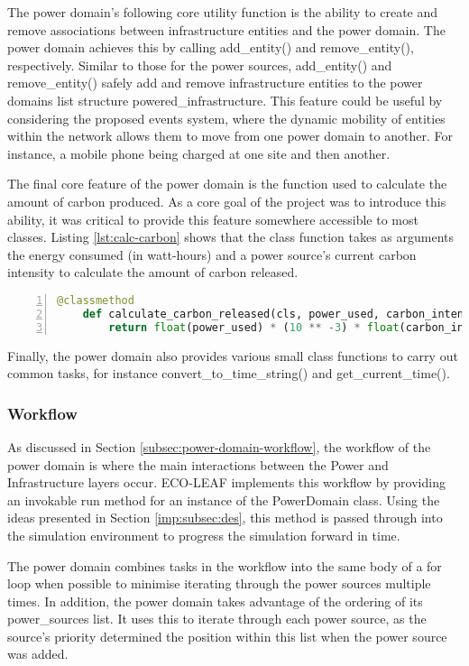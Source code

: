 \documentclass{l4proj}
\begin{document}
The power domain's following core utility function is the ability to create and remove associations between infrastructure entities and the power domain.
The power domain achieves this by calling add\_entity() and remove\_entity(), respectively.
Similar to those for the power sources, add\_entity() and remove\_entity() safely add and remove infrastructure entities to the power domains list structure powered\_infrastructure.
This feature could be useful by considering the proposed events system, where the dynamic mobility of entities within the network allows them to move from one power domain to another. For instance, a mobile phone being charged at one site and then another.

The final core feature of the power domain is the function used to calculate the amount of carbon produced.
As a core goal of the project was to introduce this ability, it was critical to provide this feature somewhere accessible to most classes.
Listing \ref{lst:calc-carbon} shows that the class function takes as arguments the energy consumed (in watt-hours) and a power source's current carbon intensity to calculate the amount of carbon released.
\begin{lstlisting}[language=python, numbers=left, caption={Listing showing the class method used to calculate carbon emissions.}, label=lst:calc-carbon]
    @classmethod
    def calculate_carbon_released(cls, power_used, carbon_intensity) -> float:
        return float(power_used) * (10 ** -3) * float(carbon_intensity)
\end{lstlisting}

Finally, the power domain also provides various small class functions to carry out common tasks, for instance convert\_to\_time\_string() and get\_current\_time().

\subsubsection{Workflow}\label{imp:subsec:workflow}
As discussed in Section \ref{subsec:power-domain-workflow}, the workflow of the power domain is where the main interactions between the Power and Infrastructure layers occur.
ECO-LEAF implements this workflow by providing an invokable run method for an instance of the PowerDomain class.
Using the ideas presented in Section \ref{imp:subsec:des}, this method is passed through into the simulation environment to progress the simulation forward in time.

The power domain combines tasks in the workflow into the same body of a for loop when possible to minimise iterating through the power sources multiple times.
In addition, the power domain takes advantage of the ordering of its power\_sources list. It uses this to iterate through each power source, as the source's priority determined the position within this list when the power source was added.
\end{document}
